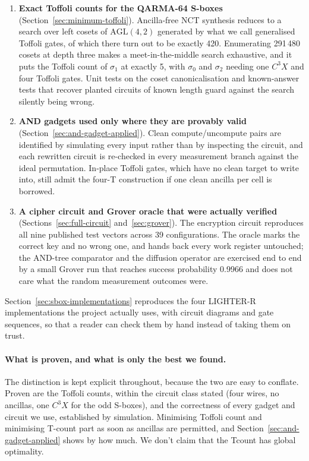 \documentclass[runningheads,10pt]{llncs}
\begin{document}
\begin{enumerate}
\item \textbf{Exact Toffoli counts for the QARMA-64 S-boxes} (Section~\ref{sec:minimum-toffoli}). Ancilla-free NCT synthesis reduces to a search over left cosets of $\mathrm{AGL}(4,2)$ generated by what we call generalised Toffoli gates, of which there turn out to be exactly 420. Enumerating 291\,480 cosets at depth three makes a meet-in-the-middle search exhaustive, and it puts the Toffoli count of $\sigma_1$ at exactly 5, with $\sigma_0$ and $\sigma_2$ needing one $C^3X$ and four Toffoli gates. Unit tests on the coset canonicalisation and known-answer tests that recover planted circuits of known length guard against the search silently being wrong.

\item \textbf{AND gadgets used only where they are provably valid} (Section~\ref{sec:and-gadget-applied}). Clean compute/uncompute pairs are identified by simulating every input rather than by inspecting the circuit, and each rewritten circuit is re-checked in every measurement branch against the ideal permutation. In-place Toffoli gates, which have no clean target to write into, still admit the four-T construction if one clean ancilla per cell is borrowed.

\item \textbf{A cipher circuit and Grover oracle that were actually verified} (Sections~\ref{sec:full-circuit} and~\ref{sec:grover}). The encryption circuit reproduces all nine published test vectors across 39 configurations. The oracle marks the correct key and no wrong one, and hands back every work register untouched; the AND-tree comparator and the diffusion operator are exercised end to end by a small Grover run that reaches success probability 0.9966 and does not care what the random measurement outcomes were.
\end{enumerate}

Section~\ref{sec:sbox-implementations} reproduces the four LIGHTER-R implementations the project actually uses, with circuit diagrams and gate sequences, so that a reader can check them by hand instead of taking them on trust.

\paragraph{What is proven, and what is only the best we found.} The distinction is kept explicit throughout, because the two are easy to conflate. Proven are the Toffoli counts, within the circuit class stated (four wires, no ancillas, one $C^3X$ for the odd S-boxes), and the correctness of every gadget and circuit we use, established by simulation. Minimising Toffoli count and minimising T-count part  as soon as ancillas are permitted, and Section~\ref{sec:and-gadget-applied} shows by how much. We don't claim that the Tcount has global optimality.
\end{document}
